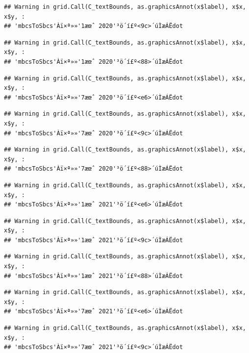 \documentclass[
]{book}
\begin{document}
\begin{verbatim}
## Warning in grid.Call(C_textBounds, as.graphicsAnnot(x$label), x$x, x$y, :
## 'mbcsToSbcs'Àï×ª»»'1æœˆ 2020'³ö´í£º<9c>´úÌæÁËdot
\end{verbatim}

\begin{verbatim}
## Warning in grid.Call(C_textBounds, as.graphicsAnnot(x$label), x$x, x$y, :
## 'mbcsToSbcs'Àï×ª»»'1æœˆ 2020'³ö´í£º<88>´úÌæÁËdot
\end{verbatim}

\begin{verbatim}
## Warning in grid.Call(C_textBounds, as.graphicsAnnot(x$label), x$x, x$y, :
## 'mbcsToSbcs'Àï×ª»»'7æœˆ 2020'³ö´í£º<e6>´úÌæÁËdot
\end{verbatim}

\begin{verbatim}
## Warning in grid.Call(C_textBounds, as.graphicsAnnot(x$label), x$x, x$y, :
## 'mbcsToSbcs'Àï×ª»»'7æœˆ 2020'³ö´í£º<9c>´úÌæÁËdot
\end{verbatim}

\begin{verbatim}
## Warning in grid.Call(C_textBounds, as.graphicsAnnot(x$label), x$x, x$y, :
## 'mbcsToSbcs'Àï×ª»»'7æœˆ 2020'³ö´í£º<88>´úÌæÁËdot
\end{verbatim}

\begin{verbatim}
## Warning in grid.Call(C_textBounds, as.graphicsAnnot(x$label), x$x, x$y, :
## 'mbcsToSbcs'Àï×ª»»'1æœˆ 2021'³ö´í£º<e6>´úÌæÁËdot
\end{verbatim}

\begin{verbatim}
## Warning in grid.Call(C_textBounds, as.graphicsAnnot(x$label), x$x, x$y, :
## 'mbcsToSbcs'Àï×ª»»'1æœˆ 2021'³ö´í£º<9c>´úÌæÁËdot
\end{verbatim}

\begin{verbatim}
## Warning in grid.Call(C_textBounds, as.graphicsAnnot(x$label), x$x, x$y, :
## 'mbcsToSbcs'Àï×ª»»'1æœˆ 2021'³ö´í£º<88>´úÌæÁËdot
\end{verbatim}

\begin{verbatim}
## Warning in grid.Call(C_textBounds, as.graphicsAnnot(x$label), x$x, x$y, :
## 'mbcsToSbcs'Àï×ª»»'7æœˆ 2021'³ö´í£º<e6>´úÌæÁËdot
\end{verbatim}

\begin{verbatim}
## Warning in grid.Call(C_textBounds, as.graphicsAnnot(x$label), x$x, x$y, :
## 'mbcsToSbcs'Àï×ª»»'7æœˆ 2021'³ö´í£º<9c>´úÌæÁËdot
\end{verbatim}
\end{document}

